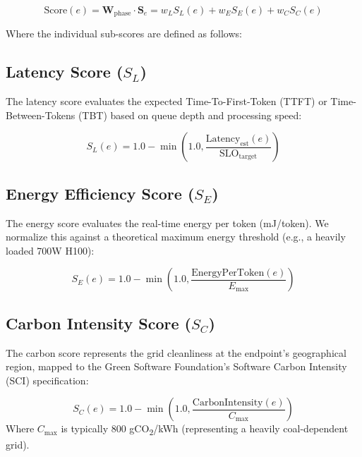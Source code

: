 \begin{equation}
\label{eq:score-final}
\text{Score}(e) = \mathbf{W}_{\text{phase}} \cdot \mathbf{S}_e = w_L S_L(e) + w_E S_E(e) + w_C S_C(e)
\end{equation}

Where the individual sub-scores are defined as follows:

\subsection{Latency Score ($S_L$)}
The latency score evaluates the expected Time-To-First-Token (TTFT) or Time-Between-Tokens (TBT) based on queue depth and processing speed:

\begin{equation}
\label{eq:score-latency}
S_L(e) = 1.0 - \min\left(1.0, \frac{\text{Latency}_{\text{est}}(e)}{\text{SLO}_{\text{target}}}\right)
\end{equation}

\subsection{Energy Efficiency Score ($S_E$)}
The energy score evaluates the real-time energy per token (mJ/token). We normalize this against a theoretical maximum energy threshold (e.g., a heavily loaded 700W H100):

\begin{equation}
\label{eq:score-energy}
S_E(e) = 1.0 - \min\left(1.0, \frac{\text{EnergyPerToken}(e)}{E_{\max}}\right)
\end{equation}

\subsection{Carbon Intensity Score ($S_C$)}
The carbon score represents the grid cleanliness at the endpoint's geographical region, mapped to the Green Software Foundation's Software Carbon Intensity (SCI) specification:

\begin{equation}
\label{eq:score-carbon}
S_C(e) = 1.0 - \min\left(1.0, \frac{\text{CarbonIntensity}(e)}{C_{\max}}\right)
\end{equation}
Where $C_{\max}$ is typically 800 gCO\textsubscript{2}/kWh (representing a heavily coal-dependent grid).


